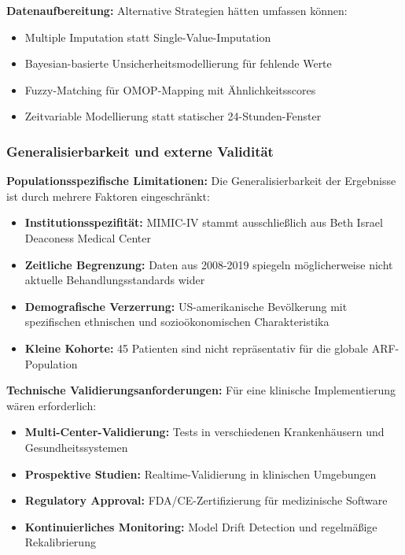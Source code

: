 \documentclass[12pt]{article}
\begin{document}
\textbf{Datenaufbereitung:}
Alternative Strategien hätten umfassen können:
\begin{itemize}
    \item Multiple Imputation statt Single-Value-Imputation
    \item Bayesian-basierte Unsicherheitsmodellierung für fehlende Werte
    \item Fuzzy-Matching für OMOP-Mapping mit Ähnlichkeitsscores
    \item Zeitvariable Modellierung statt statischer 24-Stunden-Fenster
\end{itemize}

\subsubsection{Generalisierbarkeit und externe Validität}

\textbf{Populationsspezifische Limitationen:}
Die Generalisierbarkeit der Ergebnisse ist durch mehrere Faktoren eingeschränkt:
\begin{itemize}
    \item \textbf{Institutionsspezifität:} MIMIC-IV stammt ausschließlich aus Beth Israel Deaconess Medical Center
    \item \textbf{Zeitliche Begrenzung:} Daten aus 2008-2019 spiegeln möglicherweise nicht aktuelle Behandlungsstandards wider
    \item \textbf{Demografische Verzerrung:} US-amerikanische Bevölkerung mit spezifischen ethnischen und sozioökonomischen Charakteristika
    \item \textbf{Kleine Kohorte:} 45 Patienten sind nicht repräsentativ für die globale ARF-Population
\end{itemize}

\textbf{Technische Validierungsanforderungen:}
Für eine klinische Implementierung wären erforderlich:
\begin{itemize}
    \item \textbf{Multi-Center-Validierung:} Tests in verschiedenen Krankenhäusern und Gesundheitssystemen
    \item \textbf{Prospektive Studien:} Realtime-Validierung in klinischen Umgebungen
    \item \textbf{Regulatory Approval:} FDA/CE-Zertifizierung für medizinische Software
    \item \textbf{Kontinuierliches Monitoring:} Model Drift Detection und regelmäßige Rekalibrierung
\end{itemize}
\end{document}
